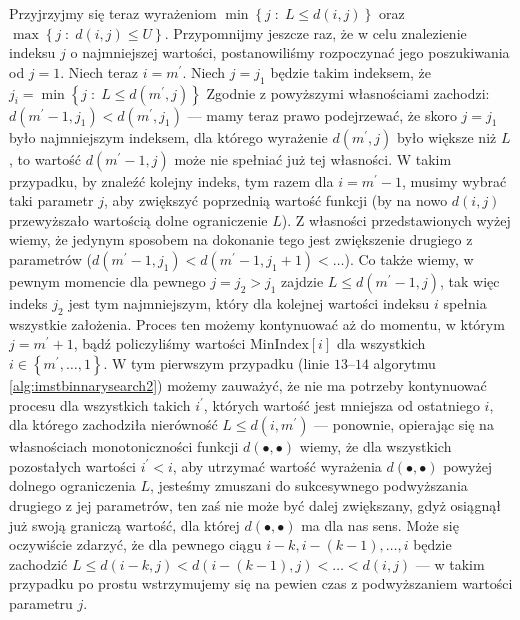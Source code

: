 {Przyjrzyjmy się teraz wyrażeniom $\min \left\{ j \; : \; L \leqslant d \left( i, j \right) \right\}$ oraz $\max \left\{ j \; : \; d \left( i, j \right) \leqslant U \right\}$. Przypomnijmy jeszcze raz, że w celu znalezienie indeksu $j$ o najmniejszej wartości, postanowiliśmy rozpoczynać jego poszukiwania od $j = 1$. Niech teraz $i = m^{\prime}$. Niech $j = j_{1}$ będzie takim indeksem, że $j_{i} = \min \left\{ j \; : \; L \leqslant d \left( m^{\prime}, j \right) \right\}$  Zgodnie z powyższymi własnościami zachodzi: $d \left( m^{\prime} - 1, j_{1} \right) < d \left( m^{\prime}, j_{1} \right) $ --- mamy teraz prawo podejrzewać, że skoro $j = j_{1}$ było najmniejszym indeksem, dla którego wyrażenie $d \left( m^{\prime}, j \right)$ było większe niż $L$, to wartość $d \left( m^{\prime} - 1, j \right)$ może nie spełniać już tej własności. W takim przypadku, by znaleźć kolejny indeks, tym razem dla $i = m^{\prime} - 1$, musimy wybrać taki parametr $j$, aby zwiększyć poprzednią wartość funkcji (by na nowo $d \left( i, j \right)$ przewyższało wartością dolne ograniczenie $L$). Z własności przedstawionych wyżej wiemy, że jedynym sposobem na dokonanie tego jest zwiększenie drugiego z parametrów ($d \left( m^{\prime} - 1, j_{1} \right) < d \left( m^{\prime} - 1, j_{1} + 1 \right) < \dots$). Co także wiemy, w pewnym momencie dla pewnego $j = j_{2} > j_{1}$ zajdzie $L \leqslant d \left( m^{\prime} - 1, j \right)$, tak więc indeks $j_{2}$ jest tym najmniejszym, który dla kolejnej wartości indeksu $i$ spełnia wszystkie założenia. Proces ten możemy kontynuować aż do momentu, w którym $j = m^{\prime} + 1$, bądź policzyliśmy wartości $\text{MinIndex} \left[ i \right]$ dla wszystkich $i \in \left\{ m^{\prime}, \dots, 1 \right\}$. W tym pierwszym przypadku (linie $13$--$14$ algorytmu \ref{alg:imstbinnarysearch2}) możemy zauważyć, że nie ma potrzeby kontynuować procesu dla wszystkich takich $i^{\prime}$, których wartość jest mniejsza od ostatniego $i$, dla którego zachodziła nierówność $L \leqslant d \left( i, m^{\prime} \right)$ --- ponownie, opierając się na własnościach monotoniczności funkcji $d \left( \bullet, \bullet \right)$ wiemy, że dla wszystkich pozostałych wartości $i^{\prime} < i$, aby utrzymać wartość wyrażenia $d \left( \bullet, \bullet \right)$ powyżej dolnego ograniczenia $L$, jesteśmy zmuszani do sukcesywnego podwyższania drugiego z jej parametrów, ten zaś nie może być dalej zwiększany, gdyż osiągnął już swoją graniczą wartość, dla której $d \left( \bullet, \bullet \right)$ ma dla nas sens. Może się oczywiście zdarzyć, że dla pewnego ciągu $i - k, i - \left( k - 1 \right), \dots, i$ będzie zachodzić $L \leqslant d \left( i - k, j \right) < d \left( i - \left( k - 1 \right), j \right) < \dots < d \left( i , j \right)$ --- w takim przypadku po prostu wstrzymujemy się na pewien czas z podwyższaniem wartości parametru $j$.

}
